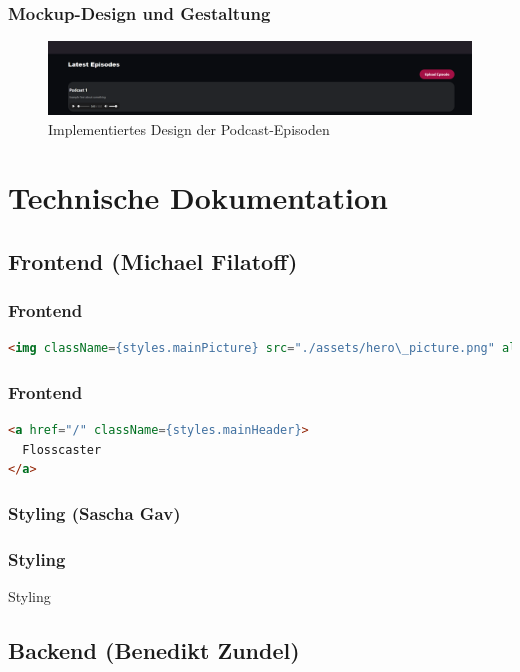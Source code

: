 \documentclass{beamer}
\begin{document}
\begin{frame}
  \frametitle{Mockup-Design und Gestaltung}
  \begin{figure}[h]
    \caption{Implementiertes Design der Podcast-Episoden}
    \centering
    \includegraphics[width=\textwidth]{flosscaster4.png}
  \end{figure}
\end{frame}

\section{Technische Dokumentation}
\subsection{Frontend \small{(Michael Filatoff)}}

\begin{frame}[fragile]
\frametitle{Frontend}
\begin{lstlisting}[label=lst:frontend-hero-image, language=html, caption=Implementation des Hero-Bilds]
<img className={styles.mainPicture} src="./assets/hero\_picture.png" alt="Hero Section"/>
\end{lstlisting}
\end{frame}

\begin{frame}[fragile]
\frametitle{Frontend}
\begin{lstlisting}[label=lst:frontend-navbar, language=html, caption=Implementation der Navbar]
<a href="/" className={styles.mainHeader}>
  Flosscaster
</a>
\end{lstlisting}
\end{frame}

\subsubsection{Styling \small{(Sascha Gav)}}
\begin{frame}
\frametitle{Styling}
\begin{center}
  \huge Styling
\end{center}
\end{frame}

\subsection{Backend \small{(Benedikt Zundel)}}
\end{document}

